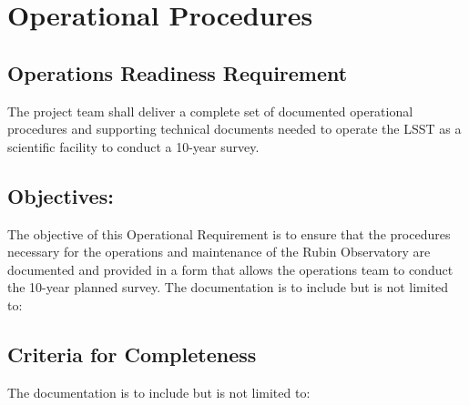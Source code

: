 \section{Operational Procedures} \label{sec:docs}

\subsection{Operations Readiness Requirement}

The project team shall deliver a complete set of documented operational procedures and supporting technical documents needed to operate the LSST as a scientific facility to conduct a 10-year survey.

\subsection{Objectives:}

The objective of this Operational Requirement is to ensure that the procedures necessary for the operations and maintenance of the Rubin Observatory are documented and provided in a form that allows the operations team to conduct the 10-year planned survey. The documentation is to include but is not limited to:


\subsection{Criteria for Completeness}

The documentation is to include but is not limited to:

